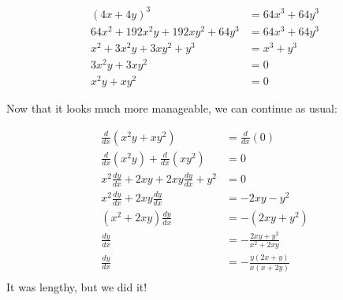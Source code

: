 \documentclass{MathNotes}
\begin{document}
\begin{align*}
	(4x+4y)^3                   & =64x^3+64y^3 \\
	64x^2+192x^2y+192xy^2+64y^3 & =64x^3+64y^3 \\
	x^2+3x^2y+3xy^2+y^3         & =x^3+y^3     \\
	3x^2y+3xy^2                 & =0           \\
	x^2y+xy^2                   & =0
\end{align*}

Now that it looks much more manageable, we can continue as usual:

\begin{align*}
	\frac{d}{dx}(x^2y+xy^2)                   & =\frac{d}{dx}(0)          \\
	\frac{d}{dx}(x^2y)+\frac{d}{dx}(xy^2)     & =0                        \\
	x^2\frac{dy}{dx}+2xy+2xy\frac{dy}{dx}+y^2 & =0                        \\
	x^2\frac{dy}{dx}+2xy\frac{dy}{dx}         & =-2xy-y^2                 \\
	(x^2+2xy)\frac{dy}{dx}                    & =-(2xy+y^2)               \\
	\frac{dy}{dx}                             & =-\frac{2xy+y^2}{x^2+2xy} \\
	\frac{dy}{dx}                             & =-\frac{y(2x+y)}{x(x+2y)} \\
\end{align*}
It was lengthy, but we did it!
\end{document}
